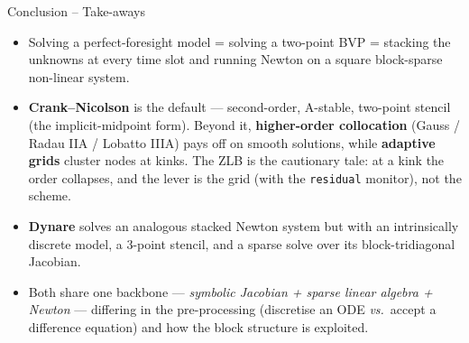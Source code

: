 \documentclass[11pt,aspectratio=169]{beamer}
\begin{document}
\begin{frame}{Conclusion -- Take-aways}

\small
\begin{itemize}

\item Solving a perfect-foresight model = solving a two-point BVP =
  stacking the unknowns at every time slot and running Newton on a
  square block-sparse non-linear system.\newline

\item \textbf{Crank--Nicolson} is the default — second-order, A-stable,
  two-point stencil (the implicit-midpoint form). Beyond it,
  \textbf{higher-order collocation} (Gauss / Radau IIA / Lobatto IIIA)
  pays off on smooth solutions, while \textbf{adaptive grids} cluster
  nodes at kinks. The ZLB is the cautionary tale: at a kink the order
  collapses, and the lever is the grid (with the \texttt{residual}
  monitor), not the scheme.\newline

\item \textbf{Dynare} solves an analogous stacked Newton system but
  with an intrinsically discrete model, a 3-point stencil, and a sparse
  solve over its block-tridiagonal Jacobian.\newline

\item Both share one backbone — \emph{symbolic Jacobian + sparse linear
  algebra + Newton} — differing in the pre-processing (discretise an ODE
  \emph{vs.}\ accept a difference equation) and how the block structure is
  exploited.

\end{itemize}

\end{frame}
\end{document}
